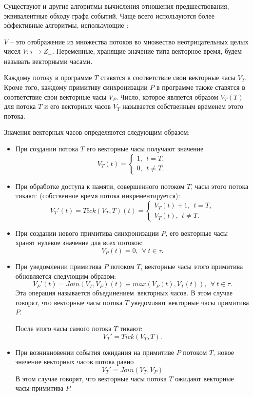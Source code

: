 Существуют и другие алгоритмы вычисления отношения предшествования, эквивалентные обходу графа событий.
Чаще всего используются более эффективные алгоритмы, использующие :

\begin{definition}
 $V$ -- это отображение из множества потоков во множество неотрицательных целых чисел $V : \tau \rightarrow Z_+$.
Переменные, хранящие значение типа векторное время, будем называть векторными часами.

Каждому потоку в программе $T$ ставятся в соответствие свои векторные часы $V_T$.
Кроме того, каждому примитиву синхронизации $P$ в программе также ставятся в соответствие свои векторные часы $V_P$.
Число, которое является образом $V_T(T)$ для потока $T$ и его векторных часов $V_T$ называется собственным временем этого потока.

Значения векторных часов определяются следующим образом:
\begin{itemize}
\item При создании потока $T$ его векторные часы получают значение
$$
V_T(t) = \begin{cases}
  1, ~~ t = T, \\
  0, ~~ t \neq T.
\end{cases}
$$
\item При обработке доступа к памяти, совершенного потоком $T$, часы этого потока \guillemotleft тикают\guillemotright~(собственное время потока инкрементируется):
$$
V_T'(t) = Tick(V_T, T)(t) = \begin{cases}
  V_T(t) + 1, ~~ t = T, \\
  V_T(t), ~~ t \neq T.
\end{cases}
$$
\item При создании нового примитива синхронизации $P$, его векторные часы хранят нулевое значение для всех потоков:
$$
V_P(t) = 0, ~~ \forall~t \in \tau.
$$
\item При уведомлении примитива $P$ потоком $T$, векторные часы этого примитива обновляется следующим образом:
$$
V_P'(t) = Join(V_T, V_P)(t) \equiv max(V_P(t), V_T(t)), ~~ \forall~t \in \tau.
$$
Эта операция называется \guillemotleft объединением\guillemotright~векторных часов.
В этом случае говорят, что векторные часы потока $T$ уведомляют векторные часы примитива $P$.

После этого часы самого потока $T$ \guillemotleft тикают\guillemotright:
$$
V_T' = Tick(V_T, T).
$$
\item При возникновении события ожидания на примитиве $P$ потоком $T$, новое значение векторных часов потока равно
$$
V_T' = Join(V_T, V_P)
$$
В этом случае говорят, что векторные часы потока $T$ ожидают векторные часы примитива $P$.
\end{itemize}
\end{definition}

